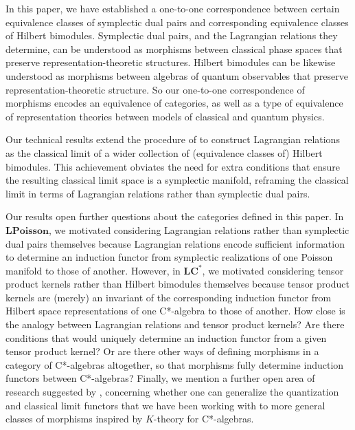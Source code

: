 \documentclass[sn-mathphys,Numbered]{sn-jnl}
\begin{document}
In this paper, we have established a one-to-one correspondence between certain equivalence classes of symplectic dual pairs and corresponding equivalence classes of Hilbert bimodules.  Symplectic dual pairs, and the Lagrangian relations they determine, can be understood as morphisms between classical phase spaces that preserve representation-theoretic structures.  Hilbert bimodules can be likewise understood as morphisms between algebras of quantum observables that preserve representation-theoretic structure.  So our one-to-one correspondence of morphisms encodes an equivalence of categories, as well as a type of equivalence of representation theories between models of classical and quantum physics.

Our technical results extend the procedure of \citet{FeSt24} to construct Lagrangian relations as the classical limit of a wider collection of (equivalence classes of) Hilbert bimodules.  This achievement obviates the need for extra conditions that ensure the resulting classical limit space is a symplectic manifold, reframing the classical limit in terms of Lagrangian relations rather than symplectic dual pairs.

Our results open further questions about the categories defined in this paper.  In $\mathbf{LPoisson}$, we motivated considering Lagrangian relations rather than symplectic dual pairs themselves because Lagrangian relations encode sufficient information to determine an induction functor from symplectic realizations of one Poisson manifold to those of another.  However, in $\mathbf{LC^*}$, we motivated considering tensor product kernels rather than Hilbert bimodules themselves because tensor product kernels are (merely) an invariant of the corresponding induction functor from Hilbert space representations of one C*-algebra to those of another.  How close is the analogy between Lagrangian relations and tensor product kernels?  Are there conditions that would uniquely determine an induction functor from a given tensor product kernel? Or are there other ways of defining morphisms in a category of C*-algebras altogether, so that morphisms fully determine induction functors between C*-algebras?  Finally, we mention a further open area of research suggested by \citet{La02a}, concerning whether one can generalize the quantization and classical limit functors that we have been working with to more general classes of morphisms inspired by $K$-theory for C*-algebras.

\newpage


\end{document}
